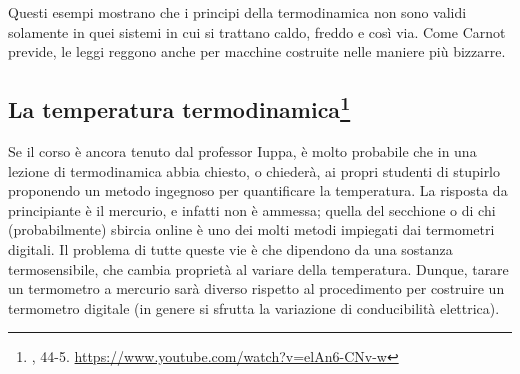 Questi esempi mostrano che i principi della termodinamica non
sono validi solamente in quei sistemi in cui si trattano caldo,
freddo e così via. Come Carnot previde, le leggi reggono anche
per macchine costruite nelle maniere più bizzarre.


\subsection[La temperatura termodinamica]{La temperatura termodinamica\footnote{\cite{feynmann}, 44-5. \href{https://www.youtube.com/watch?v=elAn6-CNv-w}{https://www.youtube.com/watch?v=elAn6-CNv-w}}}\label{the_thermodynamic_temperature} %
Se il corso è ancora tenuto dal professor Iuppa, è molto probabile
che in una lezione di termodinamica abbia chiesto, o chiederà, ai
propri studenti di stupirlo proponendo un metodo ingegnoso per quantificare
la temperatura. La risposta da principiante è il mercurio, e infatti non
è ammessa; quella del secchione o di chi (probabilmente) sbircia online
è uno dei molti metodi impiegati dai termometri digitali. Il problema di
tutte queste vie è che dipendono da una sostanza termosensibile, che
cambia proprietà al variare della temperatura. Dunque, tarare un
termometro a mercurio sarà diverso rispetto al procedimento per costruire
un termometro digitale (in genere si sfrutta la variazione di conducibilità
elettrica).





